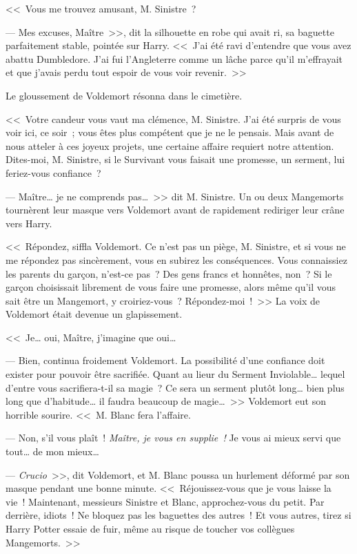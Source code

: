 <<~Vous me trouvez amusant, M. Sinistre~?

--- Mes excuses, Maître~>>, dit la silhouette en robe qui avait ri, sa baguette parfaitement stable, pointée sur Harry. <<~J'ai été ravi d'entendre que vous avez abattu Dumbledore. J'ai fui l'Angleterre comme un lâche parce qu'il m'effrayait et que j'avais perdu tout espoir de vous voir revenir.~>>

Le gloussement de Voldemort résonna dans le cimetière.

<<~Votre candeur vous vaut ma clémence, M. Sinistre. J'ai été surpris de vous voir ici, ce soir~; vous êtes plus compétent que je ne le pensais. Mais avant de nous atteler à ces joyeux projets, une certaine affaire requiert notre attention. Dites-moi, M. Sinistre, si le Survivant vous faisait une promesse, un serment, lui feriez-vous confiance~?

--- Maître… je ne comprends pas…~>> dit M. Sinistre. Un ou deux Mangemorts tournèrent leur masque vers Voldemort avant de rapidement rediriger leur crâne vers Harry.

<<~Répondez, siffla Voldemort. Ce n'est pas un piège, M. Sinistre, et si vous ne me répondez pas sincèrement, vous en subirez les conséquences. Vous connaissiez les parents du garçon, n'est-ce pas~? Des gens francs et honnêtes, non~? Si le garçon choisissait librement de vous faire une promesse, alors même qu'il vous sait être un Mangemort, y croiriez-vous~? Répondez-moi~!~>> La voix de Voldemort était devenue un glapissement.

<<~Je… oui, Maître, j'imagine que oui…

--- Bien, continua froidement Voldemort. La possibilité d'une confiance doit exister pour pouvoir être sacrifiée. Quant au lieur du Serment Inviolable… lequel d'entre vous sacrifiera-t-il sa magie~? Ce sera un serment plutôt long… bien plus long que d'habitude… il faudra beaucoup de magie…~>> Voldemort eut son horrible sourire. <<~M. Blanc fera l'affaire.

--- Non, s'il vous plaît~! \emph{Maître, je vous en supplie~!} Je vous ai mieux servi que tout… de mon mieux…

--- \emph{Crucio}~>>, dit Voldemort, et M. Blanc poussa un hurlement déformé par son masque pendant une bonne minute. <<~Réjouissez-vous que je vous laisse la vie~! Maintenant, messieurs Sinistre et Blanc, approchez-vous du petit. Par derrière, idiots~! Ne bloquez pas les baguettes des autres~! Et vous autres, tirez si Harry Potter essaie de fuir, même au risque de toucher vos collègues Mangemorts.~>>

